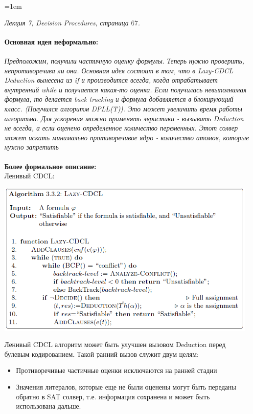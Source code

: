 \documentclass[12pt]{extreport}
\theoremstyle{definiton}
\theoremstyle{definition}
\theoremstyle{definition}
\newcommand{\solution}[2][\color{myblue}Ответ]{
\medskip
	\noindent{\bfseries #1 }{{\color{myblue}\bfseries #2:}}
}
\newenvironment{blockquote}{%
  \par%
  \medskip
  \leftskip=1em%
  \noindent}{%
  \par\medskip}
\begin{document}
\solution{14}
\begin{blockquote}
{
\color{myblue}
\textcolor{mypurpur}{\textit{Лекция 7, Decision Procedures, страница $67$.}} \\
\noindent 
\\
\textbf{Основная идея неформально:} \\ \\
\textit{Предположим, получили частичную оценку формулы. Теперь нужно проверить, непротиворечива ли она. Основная идея состоит в том, что  в Lazy-CDCL  Deduction вынесена из if и производится всегда, когда отрабатывает внутренний while и получается какая-то оценка. Если получилась невыполнимая формула, то делается back tracking и формула добавляется в блокирующий класс. (Получился алгоритм DPLL(T)). Это может увеличить время работы алгоритма. Для ускорения можно применять эвристики - вызывать Deduction не всегда, а если оценено определенное количество переменных. Этот солвер может искать минимально противоречивое ядро - количество атомов, которые нужно \glqq запретить\grqq} \\ \\
\textbf{Более формальное описание:} \\
Ленивый CDCL: 
\begin{center}
  \includegraphics[width=13cm]{images/Lazy_cdcl.png}  
\end{center}


Ленивый CDCL алгоритм может быть улучшен вызовом Deduction
перед булевым кодированием. Такой ранний вызов служит двум целям:
\begin{itemize}
    \item Противоречивые частичные оценки исключаются на ранней стадии
    \item Значения литералов, которые еще не были оценены могут быть переданы обратно в SAT солвер, т.е. информация сохранена и может быть использована дальше.
\end{itemize}

}
\end{blockquote}
\end{document}
